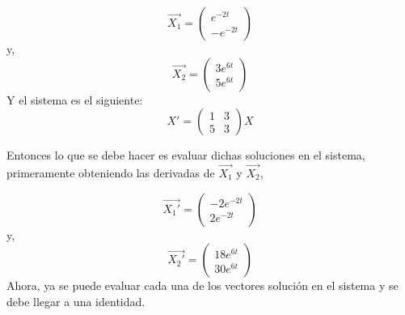 \documentclass[titlepage]{article}
\begin{document}
            \begin{equation*}
                \vec{X_1} = 
                \begin{pmatrix}
                    e^{-2t} \\
                    -e^{-2t}
                \end{pmatrix}
            \end{equation*}
            y,
            \begin{equation*}
                \vec{X_2} =
                \begin{pmatrix}
                    3e^{6t} \\
                    5e^{6t}
                \end{pmatrix}
            \end{equation*}\vspace{0.1cm}
            Y el sistema es el siguiente:
            \begin{equation*}
                X' = 
                \begin{pmatrix}
                    1 & 3 \\
                    5 & 3
                \end{pmatrix}   
                X
            \end{equation*}
            
            Entonces lo que se debe hacer es evaluar dichas soluciones en el sistema, primeramente obteniendo las derivadas de $\vec{X_1}$ y $\vec{X_2}$, 
            
                \begin{equation*}
                    \vec{X_1'} = 
                    \begin{pmatrix}
                        -2e^{-2t}\\
                        2e^{-2t}
                    \end{pmatrix}
                \end{equation*}
            y,
                 \begin{equation*}
                    \vec{X_2'} = 
                    \begin{pmatrix}
                        18e^{6t}\\
                        30e^{6t}
                    \end{pmatrix}
                \end{equation*} 
            Ahora, ya se puede evaluar cada una de los vectores solución en el sistema y se debe llegar a una identidad.\par\vspace{0.2cm}
            
\end{document}
